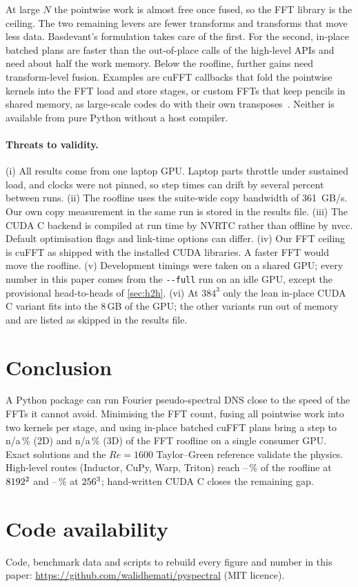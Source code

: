 \documentclass[11pt]{article}
\providecommand{\bestThreeRoof}{n/a}
\providecommand{\bestTwoRoof}{n/a}
\begin{document}
At large $N$ the pointwise work is almost free once fused, so the FFT library is the ceiling.
The two remaining levers are fewer transforms and transforms that move less data. Basdevant's
formulation takes care of the first. For the second, in-place batched plans are faster than
the out-of-place calls of the high-level APIs and need about half the work memory. Below the roofline, further gains
need transform-level fusion. Examples are cuFFT callbacks that fold the pointwise kernels into
the FFT load and store stages, or custom FFTs that keep pencils in shared memory, as large-scale
codes do with their own transposes~\cite{ravikumar2019gpu}. Neither is available from pure
Python without a host compiler.

\paragraph{Threats to validity.} (i) All results come from one laptop GPU. Laptop parts throttle
under sustained load, and clocks were not pinned, so step times can drift by several percent
between runs. (ii) The roofline uses the suite-wide copy bandwidth of \SI{361}{GB/s}. Our own
copy measurement in the same run is stored in the results file. (iii) The CUDA C backend is
compiled at run time by NVRTC rather than offline by nvcc. Default optimisation flags and
link-time options can differ. (iv) Our FFT ceiling is cuFFT as shipped with the installed CUDA libraries. A faster FFT
would move the roofline. (v) Development timings were taken on a shared GPU; every number in this paper comes from
the \texttt{-{}-full} run on an idle GPU\ifcpprovisional{}, except the provisional head-to-heads of
\cref{sec:h2h}\fi. (vi) At $384^3$ only the lean in-place CUDA C variant
fits into the 8\,GB of the GPU; the other variants run out of memory and are listed as skipped
in the results file.

\section{Conclusion}

A Python package can run Fourier pseudo-spectral DNS close to the speed of the FFTs it cannot
avoid. Minimising the FFT count, fusing all pointwise work into two kernels per stage, and using
in-place batched cuFFT plans bring a step to \bestTwoRoof\,\% (2D) and \bestThreeRoof\,\% (3D)
of the FFT roofline on a single consumer GPU. Exact solutions and the $Re=1600$ Taylor--Green
reference validate the physics. High-level routes (Inductor, CuPy, Warp, Triton) reach
\hlTwoMin--\hlTwoMax\,\% of the roofline at $8192^2$ and \hlThreeMin--\hlThreeMax\,\% at
$256^3$; hand-written CUDA C closes the remaining gap.

\section*{Code availability}
Code, benchmark data and scripts to rebuild every figure and number in this paper:
\url{https://github.com/walidhemati/pyspectral} (MIT licence).

{\footnotesize
\setlength{\bibsep}{2pt plus 1pt}


}
\end{document}
